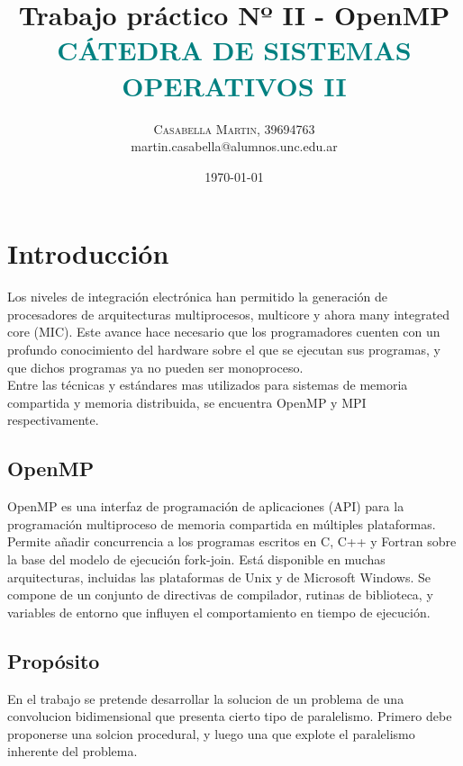 \documentclass{article}
\title{\bigskip \bigskip \bigskip \bigskip \vspace{-15mm}\fontsize{35pt}{35pt}\selectfont\textbf{{Trabajo práctico Nº II - OpenMP \\}}
\bigskip \bigskip \fontsize{18pt}{10pt}\selectfont\textbf{\textcolor{teal}{CÁTEDRA DE SISTEMAS OPERATIVOS II}}\bigskip\bigskip \bigskip\bigskip \bigskip}\bigskip\bigskip \bigskip\bigskip \bigskip %
\author{
\large
{
\textsc{Casabella Martin, 39694763 }}\\[2mm]
  martin.casabella@alumnos.unc.edu.ar\\[2mm]
\bigskip\bigskip \bigskip \bigskip\bigskip \bigskip
}
\date{\Huge\today}
\begin{document}
\maketitle
\clearpage


\renewcommand{\figurename}{\textbf{\textcolor{Orange}{Figura}}}
\renewcommand\thefigure{\textbf{\textcolor{Orange}{\arabic{figure}}}}

\tableofcontents

\clearpage


\section{Introducción}
Los niveles de integración electrónica han permitido la generación de procesadores de arquitecturas multiprocesos, multicore y ahora many integrated core
(MIC). Este avance hace necesario que los programadores cuenten con un profundo conocimiento del hardware sobre el que se ejecutan sus programas, y que
dichos programas ya no pueden ser monoproceso.\\

Entre las técnicas y estándares mas utilizados para sistemas de memoria compartida y memoria distribuida, se encuentra OpenMP y MPI respectivamente.
\subsection{OpenMP}
OpenMP es una interfaz de programación de aplicaciones (API) para la programación multiproceso de memoria compartida en múltiples plataformas. \\

Permite añadir concurrencia a los programas escritos en C, C++ y Fortran sobre la base del modelo de ejecución fork-join. Está disponible en muchas arquitecturas, incluidas las plataformas de Unix y de Microsoft Windows. Se compone de un conjunto de directivas de compilador, rutinas de biblioteca, y variables de entorno que influyen el comportamiento en tiempo de ejecución.\\
\subsection{Propósito}
En el trabajo se pretende desarrollar la solucion de un problema de una convolucion bidimensional que presenta cierto tipo  de paralelismo.
Primero debe proponerse una solcion procedural, y luego una que explote el paralelismo inherente del problema.\\
\end{document}
